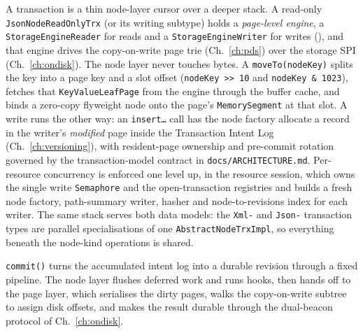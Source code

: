 \documentclass[11pt,a4paper,oneside]{report}
\theoremstyle{sirixthm}
\newcommand{\code}[1]{\texttt{#1}}
\begin{document}
A transaction is a thin node-layer cursor over a deeper stack. A read-only \code{JsonNodeReadOnlyTrx}
(or its writing subtype) holds a \emph{page-level engine}, a \code{StorageEngineReader} for reads and a
\code{StorageEngineWriter} for writes (), and that engine drives the
copy-on-write page trie (Ch.~\ref{ch:pds}) over the storage SPI (Ch.~\ref{ch:ondisk}). The node layer
never touches bytes. A \code{moveTo(nodeKey)} splits the key into a page key and a slot offset
(\code{nodeKey >> 10} and \code{nodeKey \& 1023}), fetches that \code{KeyValueLeafPage} from the engine
through the buffer cache, and binds a zero-copy flyweight node onto the page's \code{MemorySegment} at
that slot. A write runs the other way: an \code{insert\ldots} call has the node factory allocate a
record in the writer's \emph{modified} page inside the Transaction Intent Log (Ch.~\ref{ch:versioning}),
with resident-page ownership and pre-commit rotation governed by the transaction-model contract in
\code{docs/ARCHITECTURE.md}. Per-resource concurrency is enforced one level
up, in the resource session, which owns the single write \code{Semaphore} and the open-transaction
registries and builds a fresh node factory, path-summary writer, hasher and node-to-revisions index for
each writer. The same stack serves both data models: the \code{Xml-} and \code{Json-} transaction types
are parallel specialisations of one \code{AbstractNodeTrxImpl}, so everything beneath the node-kind
operations is shared.

\code{commit()} turns the accumulated intent log into a durable revision through a fixed pipeline. The
node layer flushes deferred work and runs hooks, then hands off to the page layer, which serialises the
dirty pages, walks the copy-on-write subtree to assign disk offsets, and makes the result durable
through the dual-beacon protocol of Ch.~\ref{ch:ondisk}.
\end{document}

